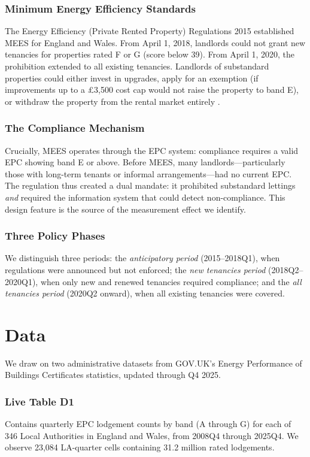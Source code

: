 \documentclass[12pt]{article}
\begin{document}
\subsubsection*{Minimum Energy Efficiency Standards} The Energy Efficiency (Private Rented Property) Regulations 2015 established MEES for England and Wales. From April 1, 2018, landlords could not grant new tenancies for properties rated F or G (score below 39). From April 1, 2020, the prohibition extended to all existing tenancies. Landlords of substandard properties could either invest in upgrades, apply for an exemption (if improvements up to a \pounds 3,500 cost cap would not raise the property to band E), or withdraw the property from the rental market entirely \citep{decc2015impact}.

\subsubsection*{The Compliance Mechanism} Crucially, MEES operates through the EPC system: compliance requires a valid EPC showing band E or above. Before MEES, many landlords---particularly those with long-term tenants or informal arrangements---had no current EPC. The regulation thus created a dual mandate: it prohibited substandard lettings \textit{and} required the information system that could detect non-compliance. This design feature is the source of the measurement effect we identify.

\subsubsection*{Three Policy Phases} We distinguish three periods: the \textit{anticipatory period} (2015--2018Q1), when regulations were announced but not enforced; the \textit{new tenancies period} (2018Q2--2020Q1), when only new and renewed tenancies required compliance; and the \textit{all tenancies period} (2020Q2 onward), when all existing tenancies were covered.

\section{Data}

We draw on two administrative datasets from GOV.UK's Energy Performance of Buildings Certificates statistics, updated through Q4 2025.

\subsubsection*{Live Table D1} Contains quarterly EPC lodgement counts by band (A through G) for each of 346 Local Authorities in England and Wales, from 2008Q4 through 2025Q4. We observe 23,084 LA-quarter cells containing 31.2 million rated lodgements.
\end{document}
